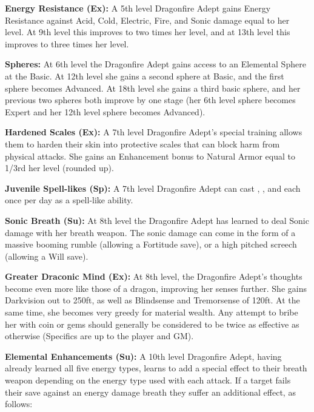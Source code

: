 \textbf{Energy Resistance (Ex):} A 5th level Dragonfire Adept gains Energy Resistance against Acid, Cold, Electric, Fire, and Sonic damage equal to her level. At 9th level this improves to two times her level, and at 13th level this improves to three times her level.

\textbf{Spheres:} At 6th level the Dragonfire Adept gains access to an Elemental Sphere at the Basic. At 12th level she gains a second sphere at Basic, and the first sphere becomes Advanced. At 18th level she gains a third basic sphere, and her previous two spheres both improve by one stage (her 6th level sphere becomes Expert and her 12th level sphere becomes Advanced).

\textbf{Hardened Scales (Ex):} A 7th level Dragonfire Adept's special training allows them to harden their skin into protective scales that can block harm from physical attacks. She gains an Enhancement bonus to Natural Armor equal to 1/3rd her level (rounded up).

\textbf{Juvenile Spell-likes (Sp):} A 7th level Dragonfire Adept can cast , , and  each once per day as a spell-like ability.

\textbf{Sonic Breath (Su):} At 8th level the Dragonfire Adept has learned to deal Sonic damage with her breath weapon. The sonic damage can come in the form of a massive booming rumble (allowing a Fortitude save), or a high pitched screech (allowing a Will save).

\textbf{Greater Draconic Mind (Ex):} At 8th level, the Dragonfire Adept's thoughts become even more like those of a dragon, improving her senses further. She gains Darkvision out to 250ft, as well as Blindsense and Tremorsense of 120ft. At the same time, she becomes very greedy for material wealth. Any attempt to bribe her with coin or gems should generally be considered to be twice as effective as otherwise (Specifics are up to the player and GM).

\textbf{Elemental Enhancements (Su):} A 10th level Dragonfire Adept, having already learned all five energy types, learns to add a special effect to their breath weapon depending on the energy type used with each attack. If a target fails their save against an energy damage breath they suffer an additional effect, as follows:

